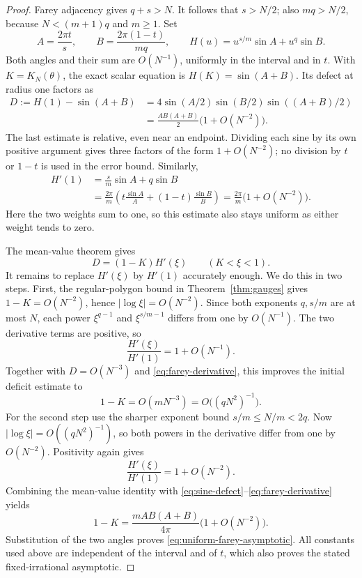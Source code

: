 \documentclass[11pt,a4paper]{article}
\theoremstyle{definition}
\theoremstyle{remark}
\numberwithin{equation}{section}
\begin{document}
\begin{proof}
Farey adjacency gives $q+s>N$.  It follows that $s>N/2$; also
$mq>N/2$, because $N<(m+1)q$ and $m\ge1$.  Set
\[
 A=\frac{2\pi t}{s},\qquad
 B=\frac{2\pi(1-t)}{mq},\qquad
 H(u)=u^{s/m}\sin A+u^q\sin B.
\]
Both angles and their sum are $O(N^{-1})$, uniformly in the interval
and in $t$.  With $K=K_N(\theta)$, the exact scalar equation is
$H(K)=\sin(A+B)$.  Its defect at radius one factors as
\begin{equation}\label{eq:sine-defect}
 \begin{split}
 D:=H(1)-\sin(A+B)
 &=4\sin(A/2)\sin(B/2)\sin((A+B)/2)\\
 &=\frac{AB(A+B)}2\bigl(1+O(N^{-2})\bigr).
 \end{split}
\end{equation}
The last estimate is relative, even near an endpoint.  Dividing each
sine by its own positive argument gives three factors of the form
$1+O(N^{-2})$; no division by $t$ or $1-t$ is used in the error bound.
Similarly,
\begin{equation}\label{eq:farey-derivative}
 \begin{split}
 H'(1)&=\frac{s}{m}\sin A+q\sin B\\
 &=\frac{2\pi}{m}
   \left(t\frac{\sin A}{A}+(1-t)\frac{\sin B}{B}\right)
 =\frac{2\pi}{m}\bigl(1+O(N^{-2})\bigr).
 \end{split}
\end{equation}
Here the two weights sum to one, so this estimate also stays uniform
as either weight tends to zero.

The mean-value theorem gives
\[
 D=(1-K)H'(\xi)\qquad(K<\xi<1).
\]
It remains to replace $H'(\xi)$ by $H'(1)$ accurately enough.  We do
this in two steps.  First, the regular-polygon bound in
Theorem~\ref{thm:gauges} gives $1-K=O(N^{-2})$, hence
$|\log\xi|=O(N^{-2})$.  Since both exponents $q,s/m$ are at most
$N$, each power $\xi^{q-1}$ and $\xi^{s/m-1}$ differs from one by
$O(N^{-1})$.  The two derivative terms are positive, so
\[
 \frac{H'(\xi)}{H'(1)}=1+O(N^{-1}).
\]
Together with $D=O(N^{-3})$ and \eqref{eq:farey-derivative}, this
improves the initial deficit estimate to
\[
 1-K=O(mN^{-3})=O\bigl((qN^2)^{-1}\bigr).
\]
For the second step use the sharper exponent bound
$s/m\le N/m<2q$.  Now $|\log\xi|=O((qN^2)^{-1})$, so both powers
in the derivative differ from one by $O(N^{-2})$.  Positivity again gives
\[
 \frac{H'(\xi)}{H'(1)}=1+O(N^{-2}).
\]
Combining the mean-value identity with
\eqref{eq:sine-defect}--\eqref{eq:farey-derivative} yields
\[
 1-K=\frac{mAB(A+B)}{4\pi}\bigl(1+O(N^{-2})\bigr).
\]
Substitution of the two angles proves
\eqref{eq:uniform-farey-asymptotic}.  All constants used above are
independent of the interval and of $t$, which also proves the stated
fixed-irrational asymptotic.
\end{proof}
\end{document}
